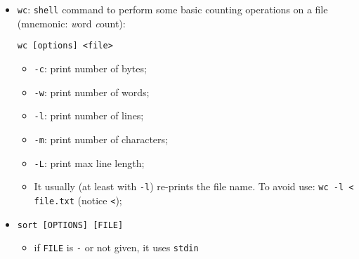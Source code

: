 \documentclass[a4paper,12pt,%
              final%
              ]{article}
\begin{document}
\begin{itemize}
\begin{verbatim}
echo "Message Body Here" | \
    mail -s "Subject Here" -A attachment.txt user@example.com
\end{verbatim}
    \begin{itemize}
      \item Other useful options:
        \begin{itemize}
          \item \verb|-c me@me.me|: CC-address
          \item \verb|-b me@me.me|: BCC-address
          \item \verb|-r me@me.me|: sender address
        \end{itemize}
      \item Use file as body of the message: option \verb|-q file.txt|. \textbf{However}, this might not work as expected: if the command finds non-standard charcters, even new-lines (!) instead of using the text it will attach it as a binary file. The following might work (see this \href{https://unix.stackexchange.com/a/522868/502731}{SO discussion}):
\begin{verbatim}
tr -cd "[:print:]\n" < file.txt | \
    mailx -s "Subject Here" user@example.com
\end{verbatim}
    \end{itemize}
  \item \texttt{wc}: \texttt{shell} command to perform some basic counting operations on a file (mnemonic: \emph{w}ord \emph{c}ount):
\begin{verbatim}
wc [options] <file>
\end{verbatim}
    \begin{itemize}
      \item \verb|-c|: print number of bytes;
      \item \verb|-w|: print number of words;
      \item \verb|-l|: print number of lines;
      \item \verb|-m|: print number of characters;
      \item \verb|-L|: print max line length;
      \item It usually (at least with \verb|-l|) re-prints the file name. To avoid use: \verb|wc -l < file.txt| (notice \verb|<|);
    \end{itemize}
  \item \texttt{sort [OPTIONS] [FILE]}
    \begin{itemize}
      \item if \texttt{FILE} is \texttt{-} or not given, it uses \texttt{stdin}

\end{itemize}
\end{itemize}
\end{document}
